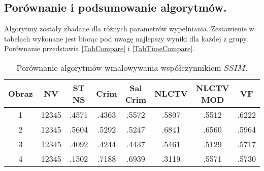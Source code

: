 \documentclass[12pt, twoside, openany]{report}
\theoremstyle{definition}
\begin{document}
\subsection{Porównanie i podsumowanie algorytmów.}
Algorytmy zostały zbadane dla różnych parametrów wypełniania. Zestawienie w tabelach wykonane jest biorąc pod uwagę najlepszy wyniki dla każdej z grupy. Porównanie przedstawia \autoref{TabCompare} i \autoref{TabTimeCompare}.
\begin{table}[!h]
\centering
 \begin{tabular}{||c | c | c | c | c | c | c | c||} 
 \hline
Obraz &
NV     & ST NS & Crim  & Sal Crim & NLCTV & NLCTV MOD & VF \\ [0.5ex] \hline \hline
1  &
12345  & .4571 & .4363 & .5572    & .5807 & .5512     & .6222 \\ \hline
2  &
12345  & .5604 & .5292 & .5247    & .6841 & .6560     & .5964 \\ \hline
3  &
12345  & .4092 & .4244 & .4437    & .5461 & .5129     & .5717 \\ \hline
4  &
12345  & .1502 & .7188 & .6939    & .3119 & .5571     & .5730 \\ \hline
\end{tabular}
\caption{Porównanie algorytmów wmalowywania współczynnikiem $SSIM$.}
\label{TabCompare}
\end{table}
\end{document}
